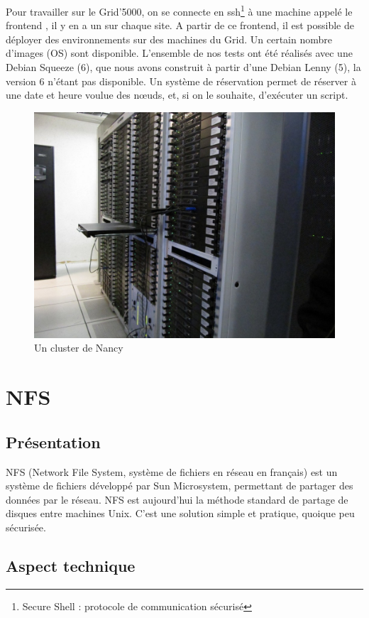 \documentclass[12pt]{report}
\begin{document}
		Pour travailler sur le Grid'5000, on se connecte en ssh\footnote{Secure Shell : protocole de communication sécurisé} à une machine appelé le \og frontend \fg, il y en a un sur chaque site.
		A partir de ce frontend, il est possible de déployer des environnements sur des machines du Grid.
		Un certain nombre d'images (OS) sont disponible. L'ensemble de nos tests ont été réalisés avec une Debian Squeeze (6),
		que nous avons construit à partir d'une Debian Lenny (5), la version 6 n'étant pas disponible.
		Un système de réservation permet de réserver à une date et heure voulue des nœuds, et, si on le souhaite,
		d'exécuter un script.

		\begin{figure}[H]
			\begin{center}
				\includegraphics[width=0.6\linewidth]{images/cluster_nancy.jpg}
				\caption{Un cluster de Nancy}
			\end{center}
		\end{figure}
		


	\chapter{NFS}
		\section{Présentation}

NFS (Network File System, système de fichiers en réseau en français) est un système de fichiers développé par Sun Microsystem, permettant de partager des données par le réseau. NFS est aujourd’hui la méthode standard de partage de disques entre machines Unix. 
		C’est une solution simple et pratique, quoique peu sécurisée.\\
		
		\section{Aspect technique}
		
\end{document}
